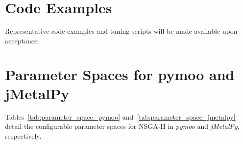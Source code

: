 \documentclass[journal]{IEEEtran}
\begin{document}
\section{Code Examples}
\label{app:code}

Representative code examples and tuning scripts will be made available upon acceptance.


\section{Parameter Spaces for pymoo and jMetalPy}
\label{app:parameter_spaces}

Tables~\ref{tab:parameter_space_pymoo} and~\ref{tab:parameter_space_jmetalpy} detail the configurable parameter spaces for NSGA-II in \textit{pymoo} and \textit{jMetalPy}, respectively.
\end{document}
